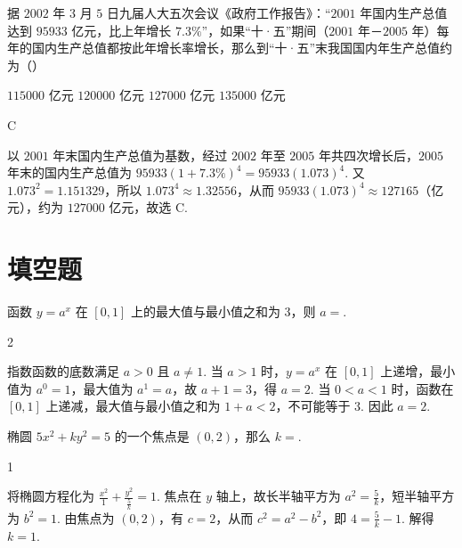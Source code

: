 \begin{problem}
据 \(2002\text{ 年}\) \(3\text{ 月}\) \(5\text{ 日}\)九届人大五次会议《政府工作报告》：“\(2001\text{ 年}\)国内生产总值达到 \(95933\text{ 亿元}\)，比上年增长 \(7.3\%\)”，如果“十·五”期间（\(2001\text{ 年}\)－\(2005\text{ 年}\)）每年的国内生产总值都按此年增长率增长，那么到“十·五”末我国国内年生产总值约为（\quad）

\choices
    {\(115000\text{ 亿元}\)}
    {\(120000\text{ 亿元}\)}
    {\(127000\text{ 亿元}\)}
    {\(135000\text{ 亿元}\)}
\end{problem}

\begin{answer}
C
\end{answer}

\begin{solution}
以 \(2001\) 年末国内生产总值为基数，经过 \(2002\) 年至 \(2005\) 年共四次增长后，\(2005\) 年末的国内生产总值为
\(\displaystyle 95933(1+7.3\%)^4=95933(1.073)^4\). 又 \(1.073^2=1.151329\)，所以 \(1.073^4\approx1.32556\)，从而 \(95933(1.073)^4\approx127165\)（亿元），约为 \(127000\) 亿元，故选 C.
\end{solution}

\section{填空题}
\begin{problem}
函数 \( y = a^x \) 在 \([0,1]\) 上的最大值与最小值之和为 3，则 \( a = \)\fillinblank{}.
\end{problem}

\begin{answer}
2
\end{answer}

\begin{solution}
指数函数的底数满足 \(a>0\) 且 \(a\neq1\). 当 \(a>1\) 时，\(y=a^x\) 在 \([0,1]\) 上递增，最小值为 \(a^0=1\)，最大值为 \(a^1=a\)，故 \(a+1=3\)，得 \(a=2\). 当 \(0<a<1\) 时，函数在 \([0,1]\) 上递减，最大值与最小值之和为 \(1+a<2\)，不可能等于 \(3\). 因此 \(a=2\).
\end{solution}

\begin{problem}
椭圆 \(5x^{2} + ky^{2} = 5\) 的一个焦点是 \((0,2)\)，那么 \(k = \)\fillinblank{}.
\end{problem}

\begin{answer}
1
\end{answer}

\begin{solution}
将椭圆方程化为 \(\displaystyle\frac{x^2}{1}+\frac{y^2}{\frac{5}{k}}=1\). 焦点在 \(y\) 轴上，故长半轴平方为 \(\displaystyle a^2=\frac{5}{k}\)，短半轴平方为 \(b^2=1\). 由焦点为 \((0,2)\)，有 \(c=2\)，从而 \(c^2=a^2-b^2\)，即 \(4=\frac{5}{k}-1\). 解得 \(k=1\).
\end{solution}

